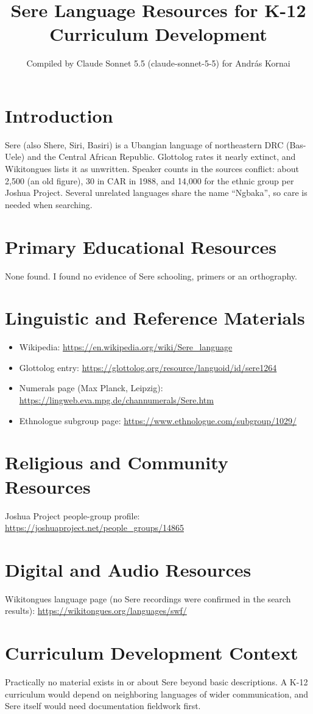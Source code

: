\documentclass[12pt]{article}
\title{Sere Language Resources for K-12 Curriculum Development}
\author{Compiled by Claude Sonnet 5.5 (claude-sonnet-5-5) for Andr\'as Kornai}
\date{}
\begin{document}
\maketitle

\section{Introduction}
Sere (also Shere, Siri, Basiri) is a Ubangian language of northeastern DRC (Bas-Uele) and the Central African Republic. Glottolog rates it nearly extinct, and Wikitongues lists it as unwritten. Speaker counts in the sources conflict: about 2,500 (an old figure), 30 in CAR in 1988, and 14,000 for the ethnic group per Joshua Project. Several unrelated languages share the name ``Ngbaka'', so care is needed when searching.

\section{Primary Educational Resources}
None found. I found no evidence of Sere schooling, primers or an orthography.

\section{Linguistic and Reference Materials}
\begin{itemize}
\item Wikipedia: \url{https://en.wikipedia.org/wiki/Sere_language}
\item Glottolog entry: \url{https://glottolog.org/resource/languoid/id/sere1264}
\item Numerals page (Max Planck, Leipzig): \url{https://lingweb.eva.mpg.de/channumerals/Sere.htm}
\item Ethnologue subgroup page: \url{https://www.ethnologue.com/subgroup/1029/}
\end{itemize}

\section{Religious and Community Resources}
Joshua Project people-group profile: \url{https://joshuaproject.net/people_groups/14865}

\section{Digital and Audio Resources}
Wikitongues language page (no Sere recordings were confirmed in the search results): \url{https://wikitongues.org/languages/swf/}

\section{Curriculum Development Context}
Practically no material exists in or about Sere beyond basic descriptions. A K-12 curriculum would depend on neighboring languages of wider communication, and Sere itself would need documentation fieldwork first.
\end{document}
